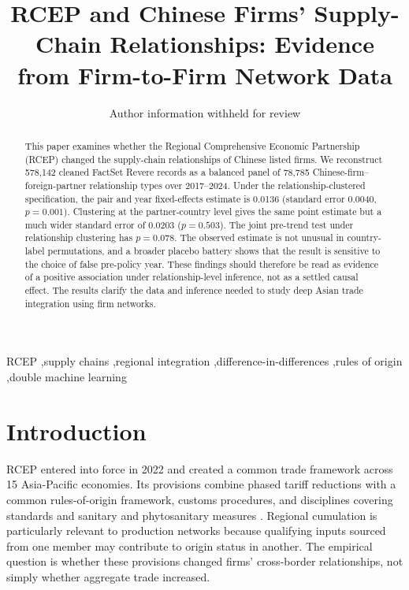 \documentclass[preprint,12pt,authoryear]{elsarticle}
\begin{document}
\begin{frontmatter}

\title{RCEP and Chinese Firms' Supply-Chain Relationships: Evidence from Firm-to-Firm Network Data}

\author{Author information withheld for review}

\begin{abstract}
This paper examines whether the Regional Comprehensive Economic Partnership (RCEP) changed the supply-chain relationships of Chinese listed firms. We reconstruct 578,142 cleaned FactSet Revere records as a balanced panel of 78,785 Chinese-firm--foreign-partner relationship types over 2017--2024. Under the relationship-clustered specification, the pair and year fixed-effects estimate is 0.0136 (standard error 0.0040, $p=0.001$). Clustering at the partner-country level gives the same point estimate but a much wider standard error of 0.0203 ($p=0.503$). The joint pre-trend test under relationship clustering has $p=0.078$. The observed estimate is not unusual in country-label permutations, and a broader placebo battery shows that the result is sensitive to the choice of false pre-policy year. These findings should therefore be read as evidence of a positive association under relationship-level inference, not as a settled causal effect. The results clarify the data and inference needed to study deep Asian trade integration using firm networks.
\end{abstract}

\begin{keyword}
RCEP \sep supply chains \sep regional integration \sep difference-in-differences \sep rules of origin \sep double machine learning
\end{keyword}

\end{frontmatter}

\section{Introduction}

RCEP entered into force in 2022 and created a common trade framework across 15 Asia-Pacific economies. Its provisions combine phased tariff reductions with a common rules-of-origin framework, customs procedures, and disciplines covering standards and sanitary and phytosanitary measures \citep{mahadevan2019,petri2020,sun2023}. Regional cumulation is particularly relevant to production networks because qualifying inputs sourced from one member may contribute to origin status in another. The empirical question is whether these provisions changed firms' cross-border relationships, not simply whether aggregate trade increased.
\end{document}
